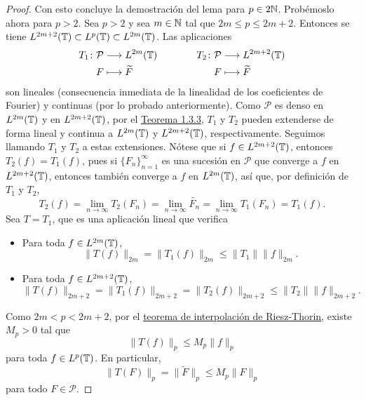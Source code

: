 \documentclass[a4paper, 12pt, oneside]{book}
\begin{document}
\begin{proof}
    Con esto concluye la demostración del lema para $p \in 2\mathbb N$. Probémoslo ahora para $p > 2$. Sea $p>2$ y sea $m\in\mathbb N$ tal que $2m\leq p \leq 2m+2$. Entonces se tiene $L^{2m+2}(\mathbb T) \subset L^p(\mathbb T) \subset L^{2m}(\mathbb T)$. Las aplicaciones
    \[
    \begin{aligned}[t]
        T_{1} \colon \mathcal{P} &\longrightarrow L^{2m}(\mathbb T) \\
        F &\longmapsto \widetilde{F} 
    \end{aligned}
    \qquad \qquad
    \begin{aligned}[t]
        T_{2} \colon \mathcal{P} &\longrightarrow L^{2m+2}(\mathbb T) \\
        F &\longmapsto \widetilde{F} 
    \end{aligned}
    \]
    son lineales (consecuencia inmediata de la linealidad de los coeficientes de Fourier) y continuas (por lo probado anteriormente). Como $\mathcal{P}$ es denso en $L^{2m}(\mathbb T)$ y en $L^{2m+2}(\mathbb T)$, por el \hyperref[1.3.3]{\color{blue}Teorema 1.3.3}, $T_{1}$ y $T_{2}$ pueden extenderse de forma lineal y continua a $L^{2m}(\mathbb T)$ y $L^{2m+2}(\mathbb T)$, respectivamente. Seguimos llamando $T_{1}$ y $T_{2}$ a estas extensiones. Nótese que si $f \in L^{2m+2}(\mathbb T)$, entonces $T_2(f) = T_1(f)$, pues si $\{F_n\}_{n=1}^\infty$ es una sucesión en $\mathcal{P}$ que converge a $f$ en $L^{2m+2}(\mathbb T)$, entonces también converge a $f$ en $L^{2m}(\mathbb T)$, así que, por definición de $T_1$ y $T_2$,
    \[T_2(f)=\lim_{n\to\infty} T_2(F_n) = \lim_{n\to\infty} \widetilde{F_n} =  \lim_{n\to\infty} T_1(F_n) = T_1(f).\] 
    Sea $T = T_{1}$, que es una aplicación lineal que verifica
    \begin{itemize}
        \item Para toda $f \in L^{2m}(\mathbb T)$, \[\|T(f)\|_{2m} = \|T_{1}(f)\|_{2m} \leq \|T_{1}\| \|f\|_{2m}.\]
        \item Para toda $f \in L^{2m+2}(\mathbb T)$, \[\|T(f)\|_{2m+2} = \|T_1(f)\|_{2m+2} = \|T_2(f)\|_{2m+2} \leq \|T_2\|\|f\|_{2m+2}.\]
    \end{itemize}
    Como $2m<p<2m+2$, por el \hyperref[3.2.2]{\color{blue}teorema de interpolación de Riesz-Thorin}, existe $M_p>0$ tal que
    \[\|T(f)\|_p  \leq M_p\|f\|_p\]
    para toda $f \in L^p(\mathbb T)$. En particular,
    \[\|T(F)\|_{p} = \|\widetilde{F}\|_{p} \leq M_p \|F\|_p\]
    para todo $F \in \mathcal{P}$. 
    

\end{proof}
\end{document}
